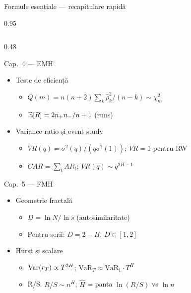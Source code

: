 \documentclass[9pt, aspectratio=169, t]{beamer}
\begin{document}
\begin{frame}[shrink=35]{Formule esențiale --- recapitulare rapidă}
\begin{cminipage}{0.95\textwidth}
\begin{columns}[T]
\begin{column}{0.48\textwidth}
\begin{block}{Cap.~4 --- EMH}
\small
\begin{itemize}\setlength{\itemsep}{0pt}
    \item Teste de eficiență
    \begin{itemize}\setlength{\itemsep}{0pt}
        \item $Q(m) = n(n+2)\sum_k \hat\rho_k^2/(n-k) \sim \chi^2_m$
        \item $\mathbb{E}[R] = 2n_+ n_-/n + 1$ (runs)
    \end{itemize}
    \item Variance ratio și event study
    \begin{itemize}\setlength{\itemsep}{0pt}
        \item $VR(q) = \sigma^2(q)/(q\sigma^2(1))$; $VR = 1$ pentru RW
        \item $CAR = \sum_t AR_t$; $VR(q) \sim q^{2H-1}$
    \end{itemize}
\end{itemize}
\end{block}

\begin{block}{Cap.~5 --- FMH}
\small
\begin{itemize}\setlength{\itemsep}{0pt}
    \item Geometrie fractală
    \begin{itemize}\setlength{\itemsep}{0pt}
        \item $D = \ln N / \ln s$ (autosimilaritate)
        \item Pentru serii: $D = 2 - H$, $D \in [1, 2]$
    \end{itemize}
    \item Hurst și scalare
    \begin{itemize}\setlength{\itemsep}{0pt}
        \item $\text{Var}(r_T) \propto T^{2H}$; $\text{VaR}_T \approx \text{VaR}_1 \cdot T^H$
        \item R/S: $R/S \sim n^H$; $\hat H$ = panta $\ln(R/S)$ vs $\ln n$
    \end{itemize}
\end{itemize}
\end{block}
\end{column}
\end{columns}
\end{cminipage}
\end{frame}

\end{document}
